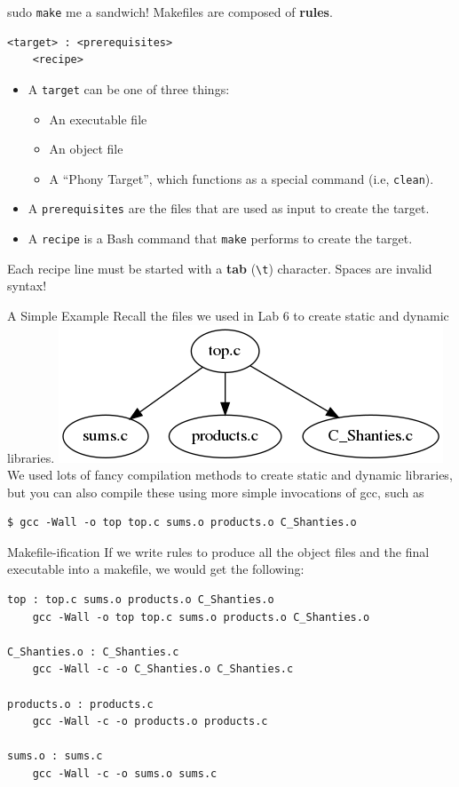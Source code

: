 \documentclass[11pt]{beamer}
\begin{document}
\begin{frame}[fragile=singleslide]{sudo \texttt{make} me a sandwich!}
Makefiles are composed of \textbf{rules}.
\begin{lstlisting}[style=terminal]
<target> : <prerequisites>
	<recipe>
\end{lstlisting}
\begin{itemize}
\item A \texttt{target} can be one of three things:
\begin{itemize}
\item An executable file
\item An object file
\item A ``Phony Target'', which functions as a special command (i.e, \texttt{clean}). 
\end{itemize}
\item A \texttt{prerequisites} are the files that are used as input to create the target.  
\item A \texttt{recipe} is a Bash command that \texttt{make} performs to create the target.  
\end{itemize}
Each recipe line must be started with a \textbf{tab} (\texttt{\textbackslash t}) character.  Spaces are invalid syntax!
\end{frame}

\begin{frame}[fragile=singleslide]{A Simple Example}
Recall the files we used in Lab 6 to create static and dynamic libraries.  
\center
\includegraphics[scale=0.5]{filegraph.png} \\
\flushleft
We used lots of fancy compilation methods to create static and dynamic libraries, but you can also compile these using more simple invocations of gcc, such as 
\begin{lstlisting}[style=terminal]
$ gcc -Wall -o top top.c sums.o products.o C_Shanties.o
\end{lstlisting}
\end{frame}

\begin{frame}[fragile=singleslide]{Makefile-ification}
If we write rules to produce all the object files and the final executable into a makefile, we would get the following: 
\begin{lstlisting}[style=terminal]
top : top.c sums.o products.o C_Shanties.o 
	gcc -Wall -o top top.c sums.o products.o C_Shanties.o

C_Shanties.o : C_Shanties.c
	gcc -Wall -c -o C_Shanties.o C_Shanties.c

products.o : products.c
	gcc -Wall -c -o products.o products.c

sums.o : sums.c
	gcc -Wall -c -o sums.o sums.c
\end{lstlisting}
\end{frame}
\end{document}
